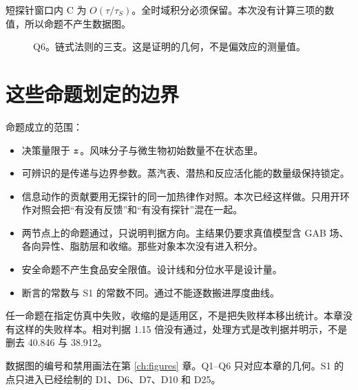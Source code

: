 短探针窗口内 C 为 \(O(\tau/\tau_S)\)。全时域积分必须保留。本次没有计算三项的数值，所以命题不产生数据图。

\begin{figure}[ht]
\centering
{}
\caption{Q6。链式法则的三支。这是证明的几何，不是偏效应的测量值。}
\end{figure}

\section{这些命题划定的边界}

命题成立的范围：

\begin{itemize}
\item 决策量限于 \(\bm{z}\)。风味分子与微生物初始数量不在状态里。
\item 可辨识的是传递与边界参数。蒸汽表、潜热和反应活化能的数量级保持锁定。
\item 信息动作的贡献要用无探针的同一加热律作对照。本次已经这样做。只用开环作对照会把“有没有反馈”和“有没有探针”混在一起。
\item 两节点上的命题通过，只说明判据方向。主结果仍要求真值模型含 GAB 场、各向异性、脂肪层和收缩。那些对象本次没有进入积分。
\item 安全命题不产生食品安全限值。设计线和分位水平是设计量。
\item 断言的常数与 S1 的常数不同。通过不能逐数搬进厚度曲线。
\end{itemize}

任一命题在指定仿真中失败，收缩的是适用区，不是把失败样本移出统计。本章没有这样的失败样本。相对判据 1.15 倍没有通过，处理方式是改判据并明示，不是删去 40.846 与 38.912。

数据图的编号和禁用画法在第 \ref{ch:figures} 章。Q1--Q6 只对应本章的几何。S1 的点只进入已经绘制的 D1、D6、D7、D10 和 D25。
